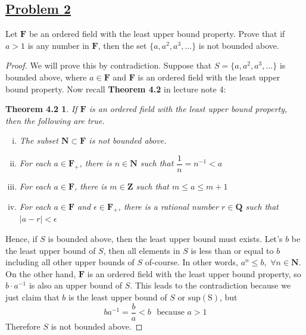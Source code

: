 \documentclass[10pt,letterpaper]{article}
\begin{document}
	\subsection*{{\color{purple}\underline{Problem 2}}}
	Let $\mathbf{F}$ be an ordered field with the least upper bound property. Prove that if
	$a > 1$ is any number in $\mathbf{F}$, then the set $\{a, a^2, a^3, \ldots \}$ is not bounded above. 
	\begin{proof}
		We will prove this by contradiction. Suppose that $S = \{a, a^2, a^3, \ldots\}$ is bounded above, where $a \in \mathbf{F}$  and
		$\mathbf{F}$ is an ordered field with the least upper bound property. Now recall \textbf{ Theorem 4.2 } in lecture note 4:
		\newtheorem*{thm}{Theorem 4.2}
		\begin{thm}
			If $\mathbf{F}$ is an ordered field with the least upper bound property, then the following are true.
			\begin{enumerate}[(i)]
				\item The subset $\mathbf{N} \subset \mathbf{F}$ is not bounded above. 
				\item For each $a \in \mathbf{F_{+}}$, there is $n \in \mathbf{N}$ such that $\dfrac{1}{n} = n^{-1} < a$
				\item For each $a \in \mathbf{F}$, there is $m \in \mathbf{Z}$ such that $m \leq a \leq m + 1$ 
				\item For each $a \in \mathbf{F}$ and $\epsilon \in \mathbf{F_{+}}$, there is a rational number $r \in \mathbf{Q}$
				such that $|a - r| < \epsilon$		
			\end{enumerate}
		\end{thm}
		Hence, if $S$ is bounded above, then the least upper bound must exists. 
		Let's $b$ be the least upper bound of $S$, then all elements in $S$ is less than or equal to $b$ including all other
		upper bounds of $S$ of-course. In other words, $a^n \leq b, \, \, \forall n \in \mathbf{N}$. 
		On the other hand, $\mathbf{F}$ is an ordered field with the least upper bound property, 
		so $b \cdot a^{-1}$ is also an upper bound of $S$. This leads to the contradiction because we just claim that $b$
		is the least upper bound of $S$ or $\mathrm{sup(S)}$, but 
		$$ba^{-1} = \dfrac{b}{a} < b \, \, \text{ because } a > 1$$
		Therefore $S$ is not bounded above.
	\end{proof}
	
\end{document}

